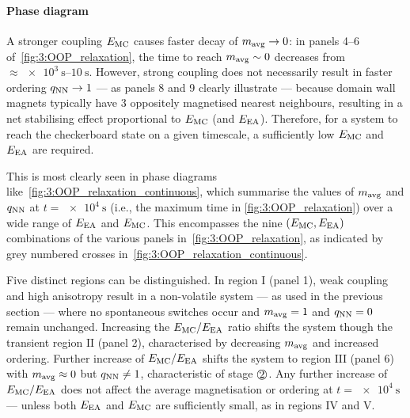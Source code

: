 \paragraph{Phase diagram}
A stronger coupling $E_\mathrm{MC}$ causes faster decay of $m_\mathrm{avg} \rightarrow 0$: in panels 4--6 of~\cref{fig:3:OOP_relaxation}, the time to reach $m_\mathrm{avg} \sim 0$ decreases from $\approx \SIrange{e3}{10}{\second}$.
However, strong coupling does not necessarily result in faster ordering $q_\mathrm{NN} \rightarrow 1$ --- as panels 8 and 9 clearly illustrate --- because domain wall magnets typically have 3 oppositely magnetised nearest neighbours, resulting in a net stabilising effect proportional to $E_\mathrm{MC}$ (and $E_\mathrm{EA}$).
Therefore, for a system to reach the checkerboard state on a given timescale, a sufficiently low $E_\mathrm{MC}$ and $E_\mathrm{EA}$ are required. \par
This is most clearly seen in phase diagrams like~\cref{fig:3:OOP_relaxation_continuous}, which summarise the values of $m_\mathrm{avg}$ and $q_\mathrm{NN}$ at $t = \SI{e4}{\second}$ (i.e., the maximum time in \cref{fig:3:OOP_relaxation}) over a wide range of $E_\mathrm{EA}$ and $E_\mathrm{MC}$.
This encompasses the nine $(E_\mathrm{MC},E_\mathrm{EA})$ combinations of the various panels in~\cref{fig:3:OOP_relaxation}, as indicated by grey numbered crosses in~\cref{fig:3:OOP_relaxation_continuous}. \par
Five distinct regions can be distinguished.
In region $\mathrm{I}$ (panel 1), weak coupling and high anisotropy result in a non-volatile system --- as used in the previous section --- where no spontaneous switches occur and $m_\mathrm{avg} = 1$ and $q_\mathrm{NN} = 0$ remain unchanged.
Increasing the $E_\mathrm{MC}/E_\mathrm{EA}$ ratio shifts the system though the transient region $\mathrm{II}$ (panel 2), characterised by decreasing $m_\mathrm{avg}$ and increased ordering.
Further increase of $E_\mathrm{MC}/E_\mathrm{EA}$ shifts the system to region $\mathrm{III}$ (panel 6) with $m_\mathrm{avg} \approx 0$ but $q_\mathrm{NN} \neq 1$, characteristic of stage $\circled{2}$.
Any further increase of $E_\mathrm{MC}/E_\mathrm{EA}$ does not affect the average magnetisation or ordering at $t = \SI{e4}{\second}$ --- unless both $E_\mathrm{EA}$ and $E_\mathrm{MC}$ are sufficiently small, as in regions $\mathrm{IV}$ and $\mathrm{V}$.

